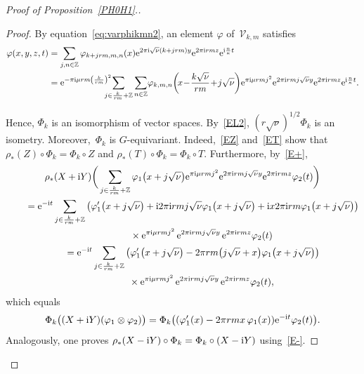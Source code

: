 \documentclass[pdftex]{sigma}
\newcommand\Z{{\mathbb Z}}
\newcommand\cV{{\mathcal V}}
\newcommand\ph{\varphi}
\numberwithin{equation}{section}
\begin{document}
\begin{proof}[Proof of Proposition~\ref{PH0H1}.]
\begin{proof}
By equation~\eqref{eq:varphikmn2}, an element $\ph$ of~$\cV_{k,m}$ satisfies
\begin{align*}
\varphi(x,y,z,t)&=\sum_{j,n\in\Z}\varphi_{k+jrm,m,n}(x){\rm e}^{2\pi {\rm i}\sqrt\nu (k+jrm)y}{\rm e}^{2\pi {\rm i}rmz}{\rm e}^{{\rm i} \frac{n}{\kappa}t}
\\
&={\rm e}^{-\pi {\rm i}\mu rm\left(\frac{k}{rm}\right)^2}\!\!\!\!\!\!\sum_{j\in\frac k{rm}+\Z}\sum_{n\in\Z}\! \varphi_{k,m,n}\bigg(\!x\!-\!\frac{k\sqrt\nu}{rm}\!+\!j\sqrt\nu\bigg){\rm e}^{\pi {\rm i}\mu rmj^2}{\rm e}^{2\pi {\rm i}rmj\sqrt\nu y}{\rm e}^{2\pi {\rm i}rmz}{\rm e}^{{\rm i} \frac{n}{\kappa}t}.
\end{align*}


 Hence, $\Phi_k$ is an isomorphism of vector spaces.
By~\eqref{EL2}, $(r\sqrt\nu)^{1/2}\Phi_k$ is an isometry.
Moreover,~$\Phi_k$ is $G$-equivariant. Indeed,~\eqref{EZ} and~\eqref{ET} show that $\rho_*(Z)\circ\Phi_k=\Phi_k\circ Z$ and $\rho_*(T)\circ\Phi_k=\Phi_k\circ T$. Furthermore, by~\eqref{E+},
\begin{gather*}
\rho_*(X+{\rm i}Y)\bigg(\sum_{j\in \frac k{rm}+\Z}
\varphi_1\big(x+j\sqrt\nu\big){\rm e}^{\pi {\rm i}\mu rmj^2}{\rm e}^{2\pi {\rm i}rmj\sqrt\nu y}{\rm e}^{2\pi {\rm i}rmz}\ph_2(t)\bigg)
\\ \qquad
{}={\rm e}^{-{\rm i}t}\sum_{j\in \frac k{rm}+\Z}\big(\varphi_1'\big(x+j\sqrt\nu\big)+{\rm i} 2\pi {\rm i}rmj\sqrt\nu\varphi_1\big(x+j\sqrt\nu\big)
+{\rm i}x2\pi {\rm i}rm\varphi_1\big(x+j\sqrt\nu\big)\big)
\\ \qquad \qquad
{}\times{\rm e}^{\pi {\rm i}\mu rmj^2}\,{\rm e}^{2\pi {\rm i}rmj\sqrt\nu y}\,{\rm e}^{2\pi {\rm i}rmz}\ph_2(t)
\\ \qquad
{}= {\rm e}^{-{\rm i}t}\sum_{j\in \frac k{rm}+\Z}\big(\varphi_1'\big(x+j\sqrt\nu\big)-2\pi rm\big(j\sqrt\nu+x\big)\varphi_1\big(x+j\sqrt\nu\big)\big)
\\ \qquad \qquad
{}\times {\rm e}^{\pi {\rm i}\mu rmj^2}\,{\rm e}^{2\pi {\rm i}rmj\sqrt\nu y}\,{\rm e}^{2\pi {\rm i}rmz}\ph_2(t),
\end{gather*}
 which equals
 \begin{gather*}
 \Phi_k\big((X+{\rm i}Y)(\ph_1\otimes\ph_2)\big)=\Phi_k\big((\ph_1'(x)-2\pi rmx\,\ph_1(x)){\rm e}^{-{\rm i}t}\ph_2(t)\big).
 \end{gather*}
 Analogously, one proves
$\rho_*(X-{\rm i}Y)\circ\Phi_k=\Phi_k\circ (X-{\rm i}Y)$ using~\eqref{E-}.
\end{proof}


\end{proof}
\end{document}
